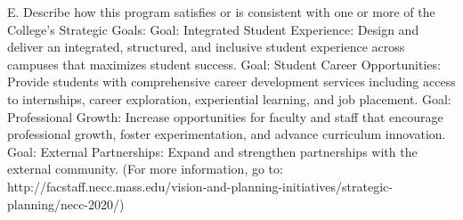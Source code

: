 E. Describe how this program satisfies or is consistent with one or more of the College’s Strategic Goals:
Goal: Integrated Student Experience: Design and deliver an integrated, structured, and inclusive student experience across campuses that maximizes student success.
Goal: Student Career Opportunities: Provide students with comprehensive career development services including access to internships, career exploration, experiential learning, and job placement.
Goal: Professional Growth: Increase opportunities for faculty and staff that encourage professional growth, foster experimentation, and advance curriculum innovation.
Goal: External Partnerships: Expand and strengthen partnerships with the external community.
	(For more information, go to: http://facstaff.necc.mass.edu/vision-and-planning-initiatives/strategic-planning/necc-2020/)

